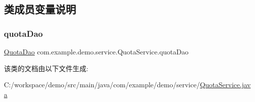 \subsection{类成员变量说明}
\mbox{\label{classcom_1_1example_1_1demo_1_1service_1_1_quota_service_a7119e367eacb1d8e0d9ab31f30d8f1fd}} 
\subsubsection{\texorpdfstring{quota\+Dao}{quotaDao}}
{\footnotesize\ttfamily \mbox{\hyperlink{interfacecom_1_1example_1_1demo_1_1dao_1_1_quota_dao}{Quota\+Dao}} com.\+example.\+demo.\+service.\+Quota\+Service.\+quota\+Dao\hspace{0.3cm}{\ttfamily [package]}}



该类的文档由以下文件生成\+:\begin{DoxyCompactItemize}
\item 
C\+:/workspace/demo/src/main/java/com/example/demo/service/\mbox{\hyperlink{_quota_service_8java}{Quota\+Service.\+java}}\end{DoxyCompactItemize}
